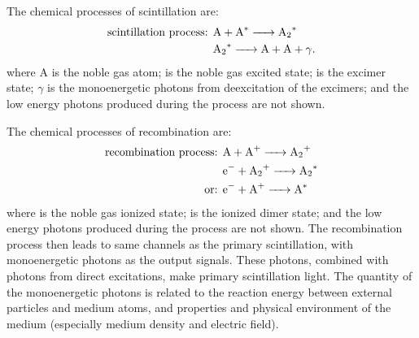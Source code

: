 The chemical processes of scintillation are:  
\begin{align}
\text{scintillation process: } & \ce{A + A^*  -> A_2^*}  \label{eqn:xenon sci 1}\\
& \ce{A_2^* ->A + A + \gamma }. \label{eqn:xenon sci 2}
\end{align}
where A is the noble gas atom;  is the noble gas excited state;  is the excimer state; $\gamma$ is the monoenergetic photons from deexcitation of the excimers; and the low energy photons produced during the process are not shown.

The chemical processes of recombination are:
\begin{align}
\text{recombination process: } & \ce{A + A^{+}  -> A_2^{+} } \\
& \ce{e^{-} + A_2^{+} ->A_2^* }\\%
\text{or: } & \ce{e^{-} + A^{+}  -> A^{*} } %
\end{align}
where   is the noble gas ionized state;  is the ionized dimer state; and the low energy photons produced during the process are not shown.%
The recombination process then leads to same channels as the primary scintillation, with monoenergetic photons as the output signals. These photons, combined with photons from direct excitations, make primary scintillation light. 
The quantity of the monoenergetic photons is related to the reaction energy between external particles and medium atoms, and properties and physical environment of the medium (especially medium density and electric field). 

